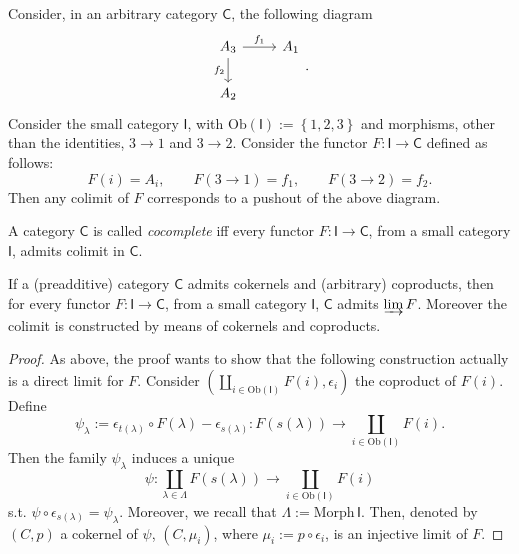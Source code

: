 \begin{ex}
	Consider, in an arbitrary category $\mathsf{C}$, the following diagram
	\begin{equation}
	\begin{tikzcd}
		A_3 \arrow[r, "f_1", rightarrow] \arrow[d, "f_2"', rightarrow] &
		A_1\\
		A_2
	\end{tikzcd}
	.\end{equation} 
	Consider the small category $\mathsf{I}$, with $\mathrm{Ob} \left(\mathsf{I}\right) := \left\{ 1, 2, 3 \right\}$ and morphisms, other than the identities, $3 \to 1$ and $3 \to 2$.
	Consider the functor $F: \mathsf{I} \to \mathsf{C}$ defined as follows:
	\begin{equation}
		F(i) = A_i, \qquad F( 3 \to 1 ) = f_1, \qquad
		F( 3 \to 2 ) = f_2
	.\end{equation} 
	Then any colimit of $F$ corresponds to a pushout of the above diagram.
\end{ex} 

\begin{defn}
	A category $\mathsf{C}$ is called {\em cocomplete} iff every functor $F: \mathsf{I} \to \mathsf{C}$, from a small category $\mathsf{I}$, admits colimit in $\mathsf{C}$.
\end{defn}

\begin{prop}\label{prop:ColimConstr}
	If a (preadditive) category $\mathsf{C}$ admits cokernels and (arbitrary) coproducts, then
	for every functor $F: \mathsf{I} \to \mathsf{C}$, from a small category $\mathsf{I}$, $\mathsf{C}$ admits $\varinjlim F$.
	Moreover the colimit is constructed by means of cokernels and coproducts.
\end{prop} 
\begin{proof}
	As above, the proof wants to show that the following construction actually is a direct limit for $F$.
	Consider $\left(\coprod_{i \in \mathrm{Ob} \left(\mathsf{I}\right)} F(i), \epsilon_i\right)$ the coproduct of $F(i)$.
	Define
	\begin{equation}
		\psi_\lambda := \epsilon_{t(\lambda)} \circ F(\lambda) - \epsilon_{s(\lambda)}:
		F \left( s(\lambda)  \right) \to \coprod_{i \in \mathrm{Ob} \left(\mathsf{I}\right)} F(i)
	.\end{equation} 
	Then the family $\psi_\lambda$ induces a unique 
	\begin{equation}
		\psi: \coprod_{\lambda \in \Lambda} F \left( s(\lambda) \right) \to \coprod_{i \in \mathrm{Ob} \left(\mathsf{I}\right)} F(i)
	\end{equation} 
	s.t. $\psi \circ \epsilon_{s(\lambda)} = \psi_\lambda$.
	Moreover, we recall that $\Lambda := \mathrm{Morph}\, \mathsf{I}$.
	Then, denoted by $\left(C, p\right)$ a cokernel of $\psi$, $\left(C, \mu_i\right)$, where $\mu_i := p \circ\epsilon_i$, is an injective limit of $F$.
\end{proof}

